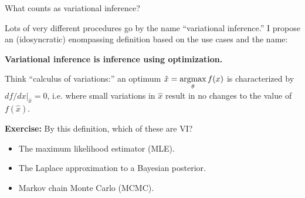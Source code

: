 

\begin{frame}{What counts as variational inference?}

Lots of very different procedures go by the name ``variational inference.''
%
I propose an (idosyncratic) enompassing definition based on the use cases and
the name:

\begin{center}
\textbf{Variational inference is inference
using optimization.}
\end{center}

%
Think ``calculus of variations:'' an optimum $\hat{x} = \underset{\theta}{\mathrm{argmax}}\, f(x)$ is
characterized by $df / dx |_{\hat{x}} = 0$, i.e.  where small variations in
$\hat{x}$ result in no changes to the value of $f(\hat{x})$.
%

\begin{center}
\end{center}


\pause
\textbf{Exercise: } By this definition, which of these are VI?
%
\begin{itemize}
    \item The maximum likelihood estimator (MLE).
    \item The Laplace approximation to a Bayesian posterior.
    \item Markov chain Monte Carlo (MCMC).
\end{itemize}
\hspace{-2em}

\end{frame}



